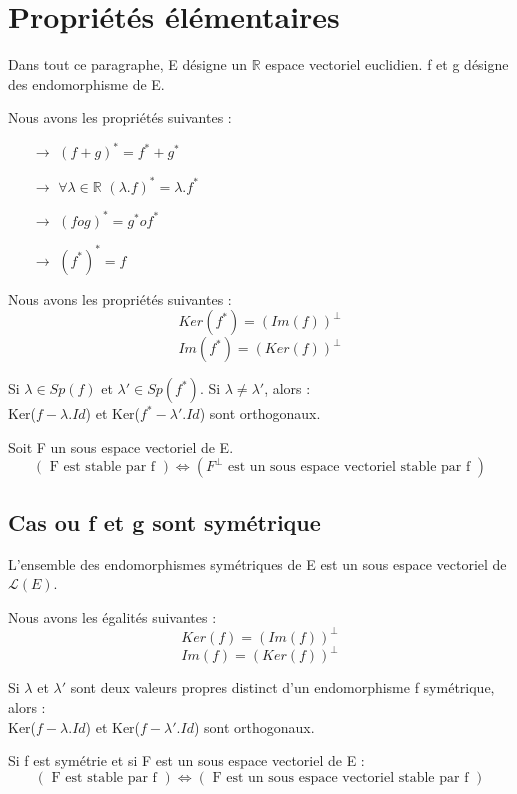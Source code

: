 \section{Propriétés élémentaires}
Dans tout ce paragraphe, E désigne un $\mathbb{R}$ espace vectoriel euclidien. f et g désigne des endomorphisme de E.
\begin{prop}
Nous avons les propriétés suivantes :
\begin{itemize}
 \item[$\rightarrow$] $(f+g)^* = f^* + g^*$
 \item[$\rightarrow$] $\forall \lambda \in \mathbb{R}$ $(\lambda.f)^* = \lambda.f^*$
 \item[$\rightarrow$] $(fog)^* = g^*of^*$
 \item[$\rightarrow$] $(f^*)^* = f$
\end{itemize}
\end{prop}
\begin{prop}
Nous avons les propriétés suivantes : 
$$Ker(f^*) = (Im(f))^{\bot}$$
$$Im(f^*) = (Ker(f))^{\bot}$$
\end{prop}
\begin{prop}
Si $\lambda \in Sp(f)$ et $\lambda' \in Sp(f^*)$. Si $\lambda \neq \lambda'$, alors : \\
Ker($f-\lambda.Id$) et Ker($f^* - \lambda'.Id$) sont orthogonaux.
\end{prop}
\begin{prop}
Soit F un sous espace vectoriel de E.
$$(\mbox{ F est stable par f }) \Leftrightarrow ( F^{\bot}\mbox{ est un sous espace vectoriel stable par f })$$
\end{prop}
\subsection{Cas ou f et g sont symétrique}
\begin{coro}
L'ensemble des endomorphismes symétriques de E est un sous espace vectoriel de $\mathcal{L}(E)$.
\end{coro}
\begin{coro}
Nous avons les égalités suivantes : 
$$Ker(f) = (Im(f))^{\bot}$$
$$Im(f) = (Ker(f))^{\bot}$$
\end{coro}
\begin{coro}
Si $\lambda$ et $\lambda'$ sont deux valeurs propres distinct d'un endomorphisme f symétrique, alors : \\
Ker($f-\lambda.Id$) et Ker($f - \lambda'.Id$) sont orthogonaux.
\end{coro}
\begin{coro}
Si f est symétrie et si F est un sous espace vectoriel de E : 
$$(\mbox{ F est stable par f }) \Leftrightarrow ( \mbox{ F est un sous espace vectoriel stable par f })$$
\end{coro}
